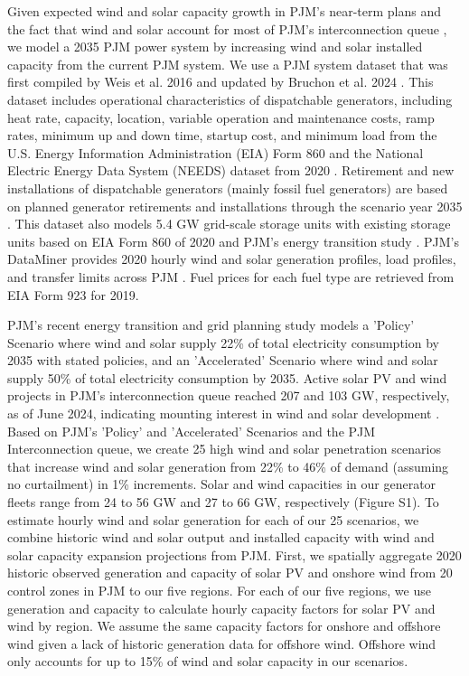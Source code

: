 \documentclass[9pt,twocolumn,twoside,lineno]{pnas-new}
\begin{document}
{Given expected wind and solar capacity growth in PJM's near-term plans and the fact that wind and solar account for most of PJM's interconnection queue \cite{pjm_energy_2021,noauthor_pjm_nodate-4}, we model a 2035 PJM power system by increasing wind and solar installed capacity from the current PJM system. We use a PJM system dataset that was first compiled by Weis et al. 2016 and updated by Bruchon et al. 2024 \cite{weis_consequential_2016,bruchon_cleaning_2024}. This dataset includes operational characteristics of dispatchable generators, including heat rate, capacity, location, variable operation and maintenance costs, ramp rates, minimum up and down time, startup cost, and minimum load from the U.S. Energy Information Administration (EIA) Form 860 and the National Electric Energy Data System (NEEDS) dataset from 2020 \cite{noauthor_form_nodate,us_epa_national_2018}. Retirement and new installations of dispatchable generators (mainly fossil fuel generators) are based on planned generator retirements and installations through the scenario year 2035 \cite{bruchon_cleaning_2024,noauthor_form_nodate}. This dataset also models 5.4 GW grid-scale storage units with existing storage units based on EIA Form 860 of 2020 and PJM's energy transition study \cite{pjm_energy_2021,noauthor_form_nodate}. PJM's DataMiner provides 2020 hourly wind and solar generation profiles, load profiles, and transfer limits across PJM \cite{noauthor_data_nodate}. Fuel prices for each fuel type are retrieved from EIA Form 923 for 2019\cite{noauthor_form_nodate-1}. 

PJM's recent energy transition and grid planning study models a 'Policy' Scenario where wind and solar supply 22\% of total electricity consumption by 2035 with stated policies, and an 'Accelerated' Scenario where wind and solar supply 50\% of total electricity consumption by 2035\cite{pjm_energy_2021}. Active solar PV and wind projects in PJM's interconnection queue reached 207 and 103 GW, respectively, as of June 2024, indicating mounting interest in wind and solar development \cite{noauthor_pjm_nodate-4}. Based on PJM's 'Policy' and 'Accelerated' Scenarios and the PJM Interconnection queue, we create 25 high wind and solar penetration scenarios that increase wind and solar generation from 22\% to 46\% of demand (assuming no curtailment) in 1\% increments. Solar and wind capacities in our generator fleets range from 24 to 56 GW and 27 to 66 GW, respectively (Figure S1). To estimate hourly wind and solar generation for each of our 25 scenarios, we combine historic wind and solar output and installed capacity with wind and solar capacity expansion projections from PJM\cite{noauthor_pjm_nodate-2,pjm_energy_2021}. First, we spatially aggregate 2020 historic observed generation and capacity of solar PV and onshore wind from 20 control zones in PJM to our five regions\cite{noauthor_pjm_nodate-4}. For each of our five regions, we use generation and capacity to calculate hourly capacity factors for solar PV and wind by region. We assume the same capacity factors for onshore and offshore wind given a lack of historic generation data for offshore wind. Offshore wind only accounts for up to 15\% of wind and solar capacity in our scenarios. 

}
\end{document}
